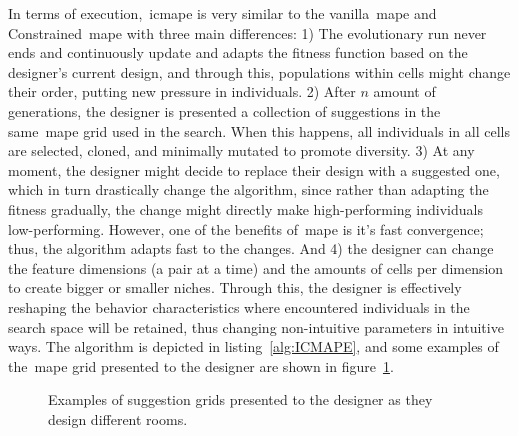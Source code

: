 In terms of execution,~\acrshort{icmape} is very similar to the vanilla~\acrshort{mape} and Constrained~\acrshort{mape} with three main differences: 1) The evolutionary run never ends and continuously update and adapts the fitness function based on the designer's current design, and through this, populations within cells might change their order, putting new pressure in individuals. 2) After $n$ amount of generations, the designer is presented a collection of suggestions in the same~\acrshort{mape} grid used in the search. When this happens, all individuals in all cells are selected, cloned, and minimally mutated to promote diversity. 3) At any moment, the designer might decide to replace their design with a suggested one, which in turn drastically change the algorithm, since rather than adapting the fitness gradually, the change might directly make high-performing individuals low-performing. However, one of the benefits of~\acrshort{mape} is it's fast convergence; thus, the algorithm adapts fast to the changes. And 4) the designer can change the feature dimensions (a pair at a time) and the amounts of cells per dimension to create bigger or smaller niches. Through this, the designer is effectively reshaping the behavior characteristics where encountered individuals in the search space will be retained, thus changing non-intuitive parameters in intuitive ways. The algorithm is depicted in listing~\ref{alg:ICMAPE}, and some examples of the~\acrshort{mape} grid presented to the designer are shown in figure~\ref{fig:MAPEGrid1}.

\begin{figure}[!h]
    \centering
     \hfill
    
    \caption{Examples of suggestion grids presented to the designer as they design different rooms.}
    \label{fig:MAPEGrid1}
\end{figure}

